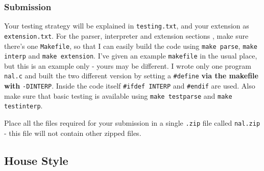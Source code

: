 \begin{exercise}
\subsection*{Submission}

Your testing strategy will be explained in \verb^testing.txt^, and
your extension as \verb^extension.txt^. For the parser, interpreter
and extension sections , make sure there's one \verb^Makefile^, so that I
can easily build the code using \verb^make parse^, \verb^make interp^
and \verb^make extension^. I've given an example \verb^makefile^ in the
usual place, but this is an example only - yours may be different.
I wrote only one program \verb^nal.c^ and built the two
different version by setting a \verb^#define^ {\bf via the makefile with}
\verb^-DINTERP^. Inside the code itself \verb^#ifdef INTERP^ and \verb^#endif^ are used.
Also make sure that basic testing is available using \verb^make testparse^ and \verb^make testinterp^.

\noindent Place all the files required for your submission in a single \verb^.zip^ file called \verb^nal.zip^ - this file will not contain other zipped files.

\end{exercise}





\appendix
\begin{appendices}

\chapter{House Style}
\label{appendix:style}


%

%

\end{appendices}


